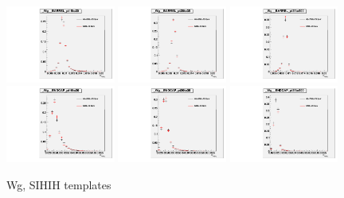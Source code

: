\begin{figure}[htb]
  \begin{center}
  \includegraphics[width=0.32\textwidth]{../figs/figs_v11/ChannelsMERGED_WGamma/QuickChecks/cTemplatesVsWMt_Wg_phoSigmaIEtaIEta_BARREL_pt15to20.pdf} \includegraphics[width=0.32\textwidth]{../figs/figs_v11/ChannelsMERGED_WGamma/QuickChecks/cTemplatesVsWMt_Wg_phoSigmaIEtaIEta_BARREL_pt20to35.pdf} \includegraphics[width=0.32\textwidth]{../figs/figs_v11/ChannelsMERGED_WGamma/QuickChecks/cTemplatesVsWMt_Wg_phoSigmaIEtaIEta_BARREL_pt35to500.pdf}\\
  \includegraphics[width=0.32\textwidth]{../figs/figs_v11/ChannelsMERGED_WGamma/QuickChecks/cTemplatesVsWMt_Wg_phoSigmaIEtaIEta_ENDCAP_pt15to20.pdf} \includegraphics[width=0.32\textwidth]{../figs/figs_v11/ChannelsMERGED_WGamma/QuickChecks/cTemplatesVsWMt_Wg_phoSigmaIEtaIEta_ENDCAP_pt20to35.pdf} \includegraphics[width=0.32\textwidth]{../figs/figs_v11/ChannelsMERGED_WGamma/QuickChecks/cTemplatesVsWMt_Wg_phoSigmaIEtaIEta_ENDCAP_pt35to500.pdf}\\
  \caption{Wg, SIHIH templates}
  \label{fig:templatesVsWMt_Wg_SIHIH}
  \end{center}
\end{figure}

